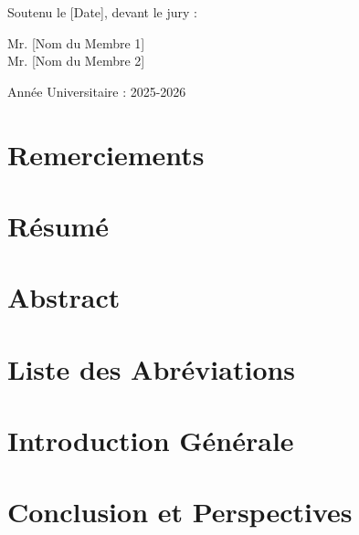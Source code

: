 \documentclass[11pt]{report}
\begin{document}
\begin{titlepage}
\begin{center}
\vfill

{\large Soutenu le [Date], devant le jury :}\\[0.5cm]
\begin{center}
    Mr. [Nom du Membre 1]\\
    Mr. [Nom du Membre 2]
\end{center}

\vfill

{\large Année Universitaire : 2025-2026}
\end{center}
\end{titlepage}


\chapter*{Remerciements}


\chapter*{Résumé}


\chapter*{Abstract}


\tableofcontents

\listoffigures
{}

\chapter*{Liste des Abréviations}


\chapter*{Introduction Générale}


\clearpage
{}







\chapter*{Conclusion et Perspectives}


\end{document}
